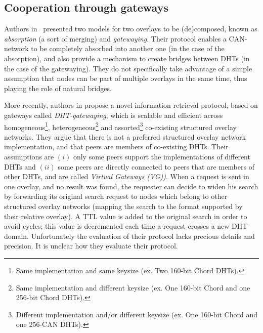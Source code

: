 \subsection{Cooperation through gateways}

Authors in~\cite{cheng2006tdh} presented two models for two overlays
to be (de)composed, known as \textit{absorption} (a sort of merging)
and \textit{gatewaying}.  Their protocol enables a CAN-network to be
completely absorbed into another one (in the case of the absorption),
and also provide a mechanism to create bridges between DHTs (in the
case of the gatewaying). They do not specifically take advantage of a
simple assumption that nodes can be part of multiple overlays in the
same time, thus playing the role of natural bridges.

More recently, authors in \cite{cheng_bridging_2007} propose a novel
information retrieval protocol, based on gateways called
\emph{DHT-gatewaying}, which is scalable and efficient across
homogeneous\footnote{Same implementation and same keysize (ex. Two
  160-bit Chord DHTs).}, heterogeneous\footnote{Same implementation
  and different keysize (ex. One 160-bit Chord and one 256-bit Chord
  DHTs).}  and assorted\footnote{Different implementation and/or
  different keysize (ex. One 160-bit Chord and one 256-CAN DHTs).}
co-existing structured overlay networks. They argue that there is not
a preferred structured overlay network implementation, and that peers
are members of co-existing DHTs. Their assumptions are $(i)$ only some
peers support the implementations of different DHTs and $(ii)$ some
peers are directly connected to peers that are members of other DHTs,
and are called \textit{Virtual Gateways (VG))}. When a request is sent
in one overlay, and no result was found, the requester can decide to
widen his search by forwarding its original search request to nodes
which belong to other structured overlay networks (mapping the search
to the format supported by their relative overlay). A TTL value is
added to the original search in order to avoid cycles; this value is
decremented each time a request crosses a new DHT
domain. Unfortunately the evaluation of their protocol lacks precious
details and precision. It is unclear how they evaluate their protocol.



